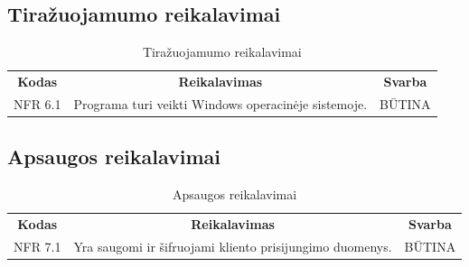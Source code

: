 \documentclass{VUMIFPSkursinis}
\begin{document}
\subsection{Tiražuojamumo reikalavimai}
\begin{center}
	\begin{table}[H]
	\caption{Tiražuojamumo reikalavimai}
	\begin{tabular}{|p{2cm}|p{}|p{}|}
	\hline
	    \rowcolor{lightgray}
		\multicolumn{3}{|c|}{Tiražuojamumo reikalavimai}\\
		
	\hline
		\multicolumn{1}{|c|}{{\bfseries Kodas}}&
		\multicolumn{1}{|c|}{{\bfseries Reikalavimas}}&
		\multicolumn{1}{|c|}{{\bfseries Svarba}}\\
	\hline 	
		\multicolumn{1}{|c|}{NFR 6.1}&
		{Programa turi veikti Windows operacinėje sistemoje.}&
		\multicolumn{1}{|c|}{BŪTINA}\\	
	
	\hline 	
	\end{tabular}
	
	\label{table:Tiražuojamumoreikalavimai}
	\end{table}

\end{center}

\subsection{Apsaugos reikalavimai}
\begin{center}
	\begin{table}[H]
	\caption{Apsaugos reikalavimai}
	\begin{tabular}{|p{2cm}|p{}|p{}|}
	\hline
	    \rowcolor{lightgray}
		\multicolumn{3}{|c|}{Apsaugos reikalavimai}\\
		
	\hline
		\multicolumn{1}{|c|}{{\bfseries Kodas}}&
		\multicolumn{1}{|c|}{{\bfseries Reikalavimas}}&
		\multicolumn{1}{|c|}{{\bfseries Svarba}}\\
	\hline 	
		\multicolumn{1}{|c|}{NFR 7.1}&
		{Yra saugomi ir šifruojami kliento prisijungimo duomenys.}&
		\multicolumn{1}{|c|}{BŪTINA}\\	
	
	\hline 	
	\end{tabular}
	
	\label{table:Apsaugosreikalavimai}
	\end{table}

\end{center}
\end{document}
